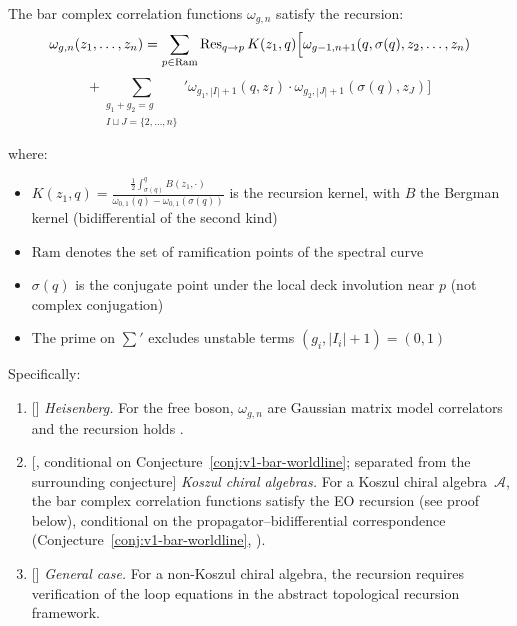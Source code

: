 \begin{conjecture}\label{conj:EO-recursion}
The bar complex correlation functions $\omega_{g,n}$ satisfy the recursion:
\[\omega_{g,n}(z_1,\ldots,z_n) = \sum_{p \in \mathrm{Ram}} \operatorname{Res}_{q \to p} K(z_1, q) \Bigl[\omega_{g-1,n+1}(q,\sigma(q),z_2,\ldots,z_n)\]
\[+ {\sum_{\substack{g_1+g_2=g \\ I \sqcup J = \{2,\ldots,n\}}}}' \omega_{g_1,|I|+1}(q,z_I) \cdot \omega_{g_2,|J|+1}(\sigma(q),z_J)\Bigr]\]

where:
\begin{itemize}
\item $K(z_1,q) = \frac{\frac{1}{2}\int_{\sigma(q)}^q B(z_1, \cdot)}{\omega_{0,1}(q) - \omega_{0,1}(\sigma(q))}$ is the recursion kernel, with $B$ the Bergman kernel (bidifferential of the second kind)
\item $\mathrm{Ram}$ denotes the set of ramification points of the spectral curve
\item $\sigma(q)$ is the conjugate point under the local deck involution near $p$ (not complex conjugation)
\item The prime on $\sum'$ excludes unstable terms $(g_i, |I_i|+1) = (0,1)$
\end{itemize}

Specifically:
\begin{enumerate}
\item[\textup{(a)}] \textup{[\ClaimStatusProvedElsewhere]}
\emph{Heisenberg.} For the free boson, $\omega_{g,n}$ are Gaussian
matrix model correlators and the recursion holds
\cite{Eyn04,CEO06,EO07}.

\item[\textup{(b)}] \textup{[\ClaimStatusConditional{}, conditional on
Conjecture~\textup{\ref{conj:v1-bar-worldline}}; separated from the surrounding conjecture]}
\emph{Koszul chiral algebras.} For a Koszul chiral
algebra~$\mathcal{A}$, the bar complex correlation functions
satisfy the EO recursion (see proof below), conditional on the
propagator--bidifferential correspondence
\textup{(}Conjecture~\textup{\ref{conj:v1-bar-worldline}},
\ClaimStatusHeuristic\textup{)}.

\item[\textup{(c)}] \textup{[\ClaimStatusConjectured]}
\emph{General case.} For a non-Koszul chiral algebra, the
recursion requires verification of the loop equations in the
abstract topological recursion framework.
\end{enumerate}

\end{conjecture}

